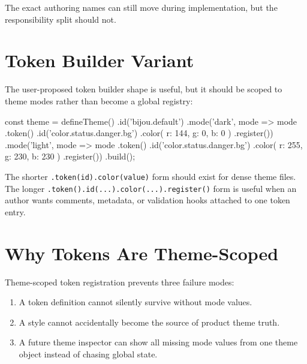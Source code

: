 The exact authoring names can still move during implementation, but the responsibility split should not.

\section{Token Builder Variant}\label{record-178-token-builder-variant}

The user-proposed token builder shape is useful, but it should be scoped to theme modes rather than become a global registry:

\begin{CodeBlock}
const theme = defineTheme()
  .id('bijou.default')
  .mode('dark', mode => mode
    .token()
    .id('color.status.danger.bg')
    .color({ r: 144, g: 0, b: 0 })
    .register())
  .mode('light', mode => mode
    .token()
    .id('color.status.danger.bg')
    .color({ r: 255, g: 230, b: 230 })
    .register())
  .build();
\end{CodeBlock}

The shorter \texttt{.\allowbreak{}t\allowbreak{}o\allowbreak{}k\allowbreak{}e\allowbreak{}n\allowbreak{}(\allowbreak{}i\allowbreak{}d\allowbreak{})\allowbreak{}.\allowbreak{}c\allowbreak{}o\allowbreak{}l\allowbreak{}o\allowbreak{}r\allowbreak{}(\allowbreak{}v\allowbreak{}a\allowbreak{}l\allowbreak{}u\allowbreak{}e\allowbreak{})} form should exist for dense theme files. The longer \texttt{.\allowbreak{}t\allowbreak{}o\allowbreak{}k\allowbreak{}e\allowbreak{}n\allowbreak{}(\allowbreak{})\allowbreak{}.\allowbreak{}i\allowbreak{}d\allowbreak{}(\allowbreak{}.\allowbreak{}.\allowbreak{}.\allowbreak{})\allowbreak{}.\allowbreak{}c\allowbreak{}o\allowbreak{}l\allowbreak{}o\allowbreak{}r\allowbreak{}(\allowbreak{}.\allowbreak{}.\allowbreak{}.\allowbreak{})\allowbreak{}.\allowbreak{}r\allowbreak{}e\allowbreak{}g\allowbreak{}i\allowbreak{}s\allowbreak{}t\allowbreak{}e\allowbreak{}r\allowbreak{}(\allowbreak{})} form is useful when an author wants comments, metadata, or validation hooks attached to one token entry.

\section{Why Tokens Are Theme-Scoped}\label{record-178-why-tokens-are-theme-scoped}

Theme-scoped token registration prevents three failure modes:

\begin{enumerate}
\def\labelenumi{\arabic{enumi}.}
\tightlist
\item
  A token definition cannot silently survive without mode values.
\item
  A style cannot accidentally become the source of product theme truth.
\item
  A future theme inspector can show all missing mode values from one theme object instead of chasing global state.
\end{enumerate}

